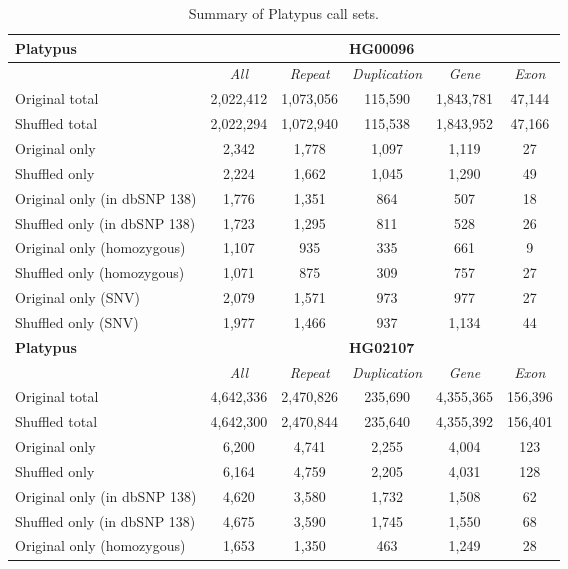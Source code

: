 \begin{table}[htb]
\caption { Summary of Platypus call sets. }
\begin{center}
\begin{tabular}{|l|c||c|c|c|c|}
\hline
{\bf Platypus} & \multicolumn{5}{|c|}{\bf HG00096} \\
\hline
\cline{2-6}
{\bf} & {\it All} & {\it Repeat} & {\it Duplication} & {\it Gene} & {\it Exon} \\
\hline
Original total & 2,022,412 & 1,073,056 & 115,590 & 1,843,781 & 47,144 \\
\hline
Shuffled total & 2,022,294 & 1,072,940 & 115,538 & 1,843,952 & 47,166 \\
\hline
Original only & 2,342 & 1,778 & 1,097 & 1,119 & 27 \\
\hline
Shuffled only & 2,224 & 1,662 & 1,045 & 1,290 & 49 \\
\hline
Original only (in dbSNP 138) & 1,776 & 1,351 & 864 & 507 & 18 \\
\hline
Shuffled only (in dbSNP 138) & 1,723 & 1,295 & 811 & 528 & 26 \\
\hline
Original only (homozygous) & 1,107 & 935 & 335 & 661 & 9 \\
\hline
Shuffled only (homozygous) & 1,071 & 875 & 309 & 757 & 27 \\
\hline
Original only (SNV) & 2,079 & 1,571 & 973 & 977 & 27 \\
\hline
Shuffled only (SNV) & 1,977 & 1,466 & 937 & 1,134 & 44 \\ 
\hline
\hline
{\bf Platypus} & \multicolumn{5}{|c|}{\bf HG02107} \\
\hline
\cline{2-6}
{\bf} & {\it All} & {\it Repeat} & {\it Duplication} & {\it Gene} & {\it Exon} \\
\hline
Original total & 4,642,336 & 2,470,826 & 235,690 & 4,355,365 & 156,396 \\
\hline
Shuffled total & 4,642,300 & 2,470,844 & 235,640 & 4,355,392 & 156,401 \\
\hline
Original only & 6,200 & 4,741 & 2,255 & 4,004 & 123 \\
\hline
Shuffled only & 6,164 & 4,759 & 2,205 & 4,031 & 128 \\
\hline
Original only (in dbSNP 138) & 4,620 & 3,580 & 1,732 & 1,508 & 62 \\
\hline
Shuffled only (in dbSNP 138) & 4,675 & 3,590 & 1,745 & 1,550 & 68 \\
\hline
Original only (homozygous) & 1,653 & 1,350 & 463 & 1,249 & 28 \\

\end{tabular}
\end{center}
\end{table}
